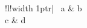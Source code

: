 \documentclass{article}
\begin{document}
\begin{tabular}{!{\vrule}l!{\vrule width 1pt}r|}\hline
\vline\ a & b\ \vline\\\hline
c & d\\
\end{tabular}
\end{document}
